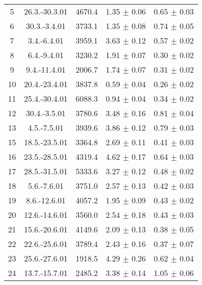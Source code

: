 \documentclass[a4paper,12pt]{article}
\begin{document}
\begin{center}
\begin{longtable}{|c|c|c|c|c|}
    5   &       26.3.-30.3.01   &       4670.4  &       1.35 $\pm$ 0.06 &       0.65 $\pm$ 0.03 \\
    6   &       30.3.-3.4.01    &       3733.1  &       1.35 $\pm$ 0.08 &       0.74 $\pm$ 0.05 \\
    7   &       3.4.-6.4.01     &       3959.1  &       3.63 $\pm$ 0.12 &       0.57 $\pm$ 0.02 \\
    8   &       6.4.-9.4.01     &       3230.2  &       1.91 $\pm$ 0.07 &       0.30 $\pm$ 0.02 \\
    9   &       9.4.-11.4.01    &       2006.7  &       1.74 $\pm$ 0.07 &       0.31 $\pm$ 0.02 \\
    10  &       20.4.-23.4.01   &       3837.8  &       0.59 $\pm$ 0.04 &       0.26 $\pm$ 0.02 \\
    11  &       25.4.-30.4.01   &       6088.3  &       0.94 $\pm$ 0.04 &       0.34 $\pm$ 0.02 \\
    12  &       30.4.-3.5.01    &       3780.6  &       3.48 $\pm$ 0.16 &       0.81 $\pm$ 0.04 \\
    13  &       4.5.-7.5.01     &       3939.6  &       3.86 $\pm$ 0.12 &       0.79 $\pm$ 0.03 \\
    15  &       18.5.-23.5.01   &       3364.8  &       2.69 $\pm$ 0.11 &       0.41 $\pm$ 0.03 \\
    16  &       23.5.-28.5.01   &       4319.4  &       4.62 $\pm$ 0.17 &       0.64 $\pm$ 0.03 \\
    17  &       28.5.-31.5.01   &       5333.6  &       3.27 $\pm$ 0.12 &       0.48 $\pm$ 0.02 \\
    18  &       5.6.-7.6.01     &       3751.0  &       2.57 $\pm$ 0.13 &       0.42 $\pm$ 0.03 \\
    19  &       8.6.-12.6.01    &       4057.2  &       1.95 $\pm$ 0.09 &       0.43 $\pm$ 0.02 \\
    20  &       12.6.-14.6.01   &       3560.0  &       2.54 $\pm$ 0.18 &       0.43 $\pm$ 0.03 \\
    21  &       15.6.-20.6.01   &       4149.6  &       2.09 $\pm$ 0.13 &       0.38 $\pm$ 0.05 \\
    22  &       22.6.-25.6.01   &       3789.4  &       2.43 $\pm$ 0.16 &       0.37 $\pm$ 0.07 \\
    23  &       25.6.-27.6.01   &       1918.5  &       4.29 $\pm$ 0.26 &       0.62 $\pm$ 0.04 \\
    24  &       13.7.-15.7.01   &       2485.2  &       3.38 $\pm$ 0.14 &       1.05 $\pm$ 0.06 \\

\end{longtable}
\end{center}
\end{document}
